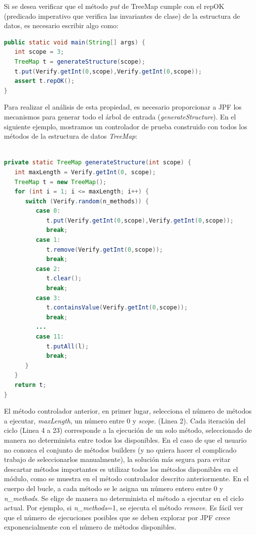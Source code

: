 Si se desea verificar que el método \emph{put}  de TreeMap cumple con el repOK (predicado imperativo que verifica las invariantes de clase) de la estructura de datos, es necesario escribir algo como: 
\\

\begin{lstlisting}[caption={Probando el método put de TreeMap con JPF},label={lst:label},language=Java,captionpos=b]
public static void main(String[] args) {
   int scope = 3;
   TreeMap t = generateStructure(scope);
   t.put(Verify.getInt(0,scope),Verify.getInt(0,scope));
   assert t.repOK();
}
\end{lstlisting}

Para realizar el análisis de esta propiedad, es necesario proporcionar a JPF los mecanismos para generar todo el árbol de entrada (\textit{generateStructure}). 
En el siguiente ejemplo, mostramos un controlador de prueba construido con todos los métodos de la estructura de datos \textit{TreeMap}:
\\
\\
\begin{lstlisting}[caption={Controlador con todos los métodos},label={lst:driverAPI},language=Java,captionpos=b]
private static TreeMap generateStructure(int scope) {
   int maxLength = Verify.getInt(0, scope);
   TreeMap t = new TreeMap();
   for (int i = 1; i <= maxLength; i++) {
      switch (Verify.random(n_methods)) {
         case 0:
            t.put(Verify.getInt(0,scope),Verify.getInt(0,scope));
            break;
         case 1:
            t.remove(Verify.getInt(0,scope));
            break;						
         case 2:
            t.clear();
            break;
         case 3:
            t.containsValue(Verify.getInt(0,scope));
            break;
         ...
         case 11: 
            t.putAll(l);
            break;
      }
   }
   return t;
}
\end{lstlisting}

El método controlador anterior, en primer lugar, selecciona el número de métodos a ejecutar, \textit{maxLength}, un número entre 0 y \textit{scope}. (Linea 2). Cada iteración del ciclo (Linea 4 a 23) corresponde a la ejecución de un solo método, seleccionado de manera no determinista entre todos los disponibles. En el caso de que el usuario no conozca el conjunto de métodos builders (y no quiera hacer el complicado trabajo de seleccionarlos manualmente), la solución más segura para evitar descartar métodos importantes es utilizar todos los métodos disponibles en el módulo, como se muestra en el método controlador descrito anteriormente. En el cuerpo del bucle, a cada método se le asigna un número entero entre 0 y \textit{n\_methods}. Se elige de manera no determinista el método a ejecutar en el ciclo actual. Por ejemplo, si \textit{n\_methods}=1, se ejecuta el método \textit{remove}. Es fácil ver que el número de ejecuciones posibles que se deben explorar por JPF crece exponencialmente con el número de métodos disponibles.

